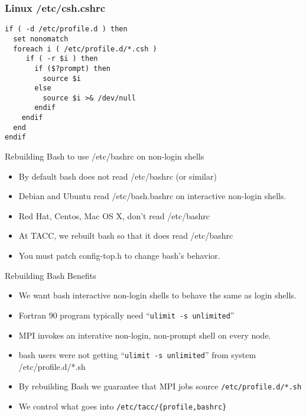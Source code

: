 \documentclass{beamer}
\begin{document}
\begin{frame}[fragile]
    \frametitle{Linux /etc/csh.cshrc}
    {
\begin{verbatim}
if ( -d /etc/profile.d ) then
  set nonomatch
  foreach i ( /etc/profile.d/*.csh )
     if ( -r $i ) then
       if ($?prompt) then
         source $i
       else
         source $i >& /dev/null
       endif
    endif
  end
endif
\end{verbatim}
    }
\end{frame}

\begin{frame}{Rebuilding Bash to use /etc/bashrc on non-login shells}
  \begin{itemize}
    \item By default bash does not read /etc/bashrc (or similar)
    \item Debian and Ubuntu read /etc/bash.bashrc on interactive
      non-login shells.
    \item Red Hat, Centos,  Mac OS X, don't read /etc/bashrc
    \item At TACC, we rebuilt bash so that it does read /etc/bashrc
    \item You must patch config-top.h to change bash's behavior.
  \end{itemize}
\end{frame}

\begin{frame}{Rebuilding Bash Benefits}
  \begin{itemize}
    \item We want bash interactive non-login shells to behave the same
      as login shells.
    \item Fortran 90 program typically need ``\texttt{ulimit -s unlimited}''
    \item MPI invokes an interative non-login, non-prompt shell on
      every node.
    \item bash users were not getting ``\texttt{ulimit -s unlimited}''
      from system /etc/profile.d/*.sh
    \item By rebuilding Bash we guarantee that MPI jobs source \texttt{/etc/profile.d/*.sh}
    \item We control what goes into \texttt{/etc/tacc/\{profile,bashrc\}}
  \end{itemize}
\end{frame}
\end{document}
